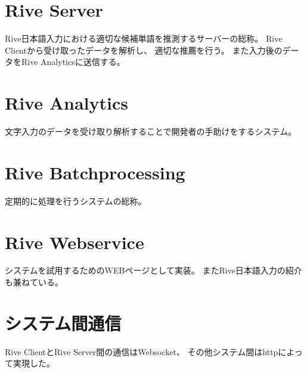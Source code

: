\section{Rive Server}
Rive日本語入力における適切な候補単語を推測するサーバーの総称。
Rive Clientから受け取ったデータを解析し、
適切な推薦を行う。
また入力後のデータをRive Analyticsに送信する。

\section{Rive Analytics}
文字入力のデータを受け取り解析することで開発者の手助けをするシステム。

\section{Rive Batchprocessing}
定期的に処理を行うシステムの総称。

\section{Rive Webservice}
システムを試用するためのWEBページとして実装。
またRive日本語入力の紹介も兼ねている。

\section{システム間通信}
Rive ClientとRive Server間の通信はWebsocket、
その他システム間はhttpによって実現した。
